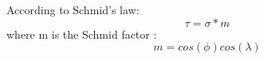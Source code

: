 \documentclass[journal,article,submit,moreauthors,pdftex,10pt,a4paper]{Definitions/mdpi}
\begin{document}
According to Schmid's law:
	$$\tau = \sigma*m$$
where m is the Schmid factor :
	$$ m = cos(\phi)cos(\lambda)$$
%	
%	
%	
%	
%	
%	
%	
%	
%	
%	
%	
%	
%	
%	
%	

\end{document}
